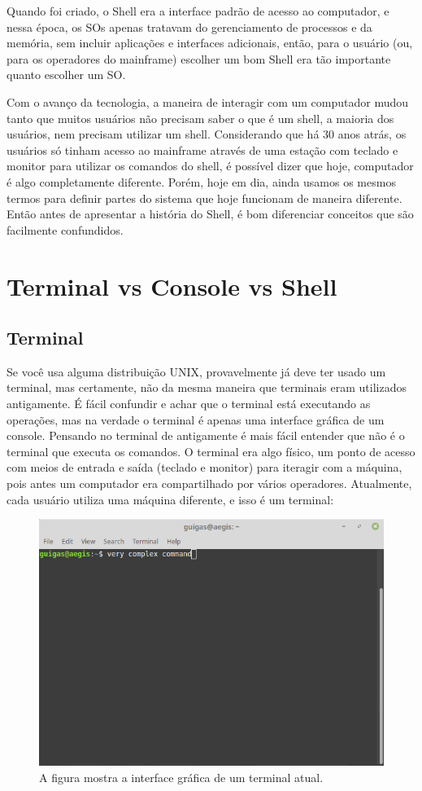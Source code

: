 \documentclass[oneside, 11 pt]{article}
\begin{document}
	Quando foi criado, o Shell era a interface padrão de acesso ao computador, e nessa época, os SOs apenas tratavam do gerenciamento de processos e da memória, sem incluir aplicações e interfaces adicionais, então, para o usuário (ou, para os operadores do mainframe) escolher um bom Shell era tão importante quanto escolher um SO.
	
	Com o avanço da tecnologia, a maneira de interagir com um computador mudou tanto que muitos usuários não precisam saber o que é um shell, a maioria dos usuários, nem precisam utilizar um shell.	Considerando que há 30 anos atrás, os usuários só tinham acesso ao mainframe através de uma estação com teclado e monitor para utilizar os comandos do shell, é possível dizer que hoje, computador é algo completamente diferente. Porém, hoje em dia, ainda usamos os mesmos termos para definir partes do sistema que hoje funcionam de maneira diferente. Então antes de apresentar a história do Shell, é bom diferenciar conceitos que são facilmente confundidos.
	
	\section{Terminal vs Console vs Shell}
	
	\subsection{Terminal}
	Se você usa alguma distribuição UNIX, provavelmente já deve ter usado um terminal, mas certamente, não da mesma maneira que terminais eram utilizados antigamente. É fácil confundir e achar que o terminal está executando as operações, mas na verdade o terminal é apenas uma interface gráfica de um console. Pensando no terminal de antigamente é mais fácil entender que não é o terminal que executa os comandos. O terminal era algo físico, um ponto de acesso com meios de entrada e saída (teclado e monitor) para iteragir com a máquina, pois antes um computador era compartilhado por vários operadores.
	Atualmente, cada usuário utiliza uma máquina diferente, e isso é um terminal:
	\begin{figure}[h]
		\includegraphics[width=\linewidth]{term2.png}
		\caption{A figura mostra a interface gráfica de um terminal atual.}
		\label{fig:term1}
	\end{figure}
\end{document}
